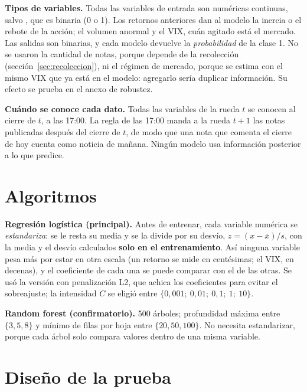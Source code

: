 \textbf{Tipos de variables.} Todas las variables de entrada son numéricas continuas, salvo
, que es binaria (0 o 1). Los retornos anteriores dan al modelo la inercia o el
rebote de la acción; el volumen anormal y el VIX, cuán agitado está el mercado. Las salidas son
binarias, y cada modelo devuelve la \textit{probabilidad} de la clase 1. No se usaron la cantidad de
notas, porque depende de la recolección (sección~\ref{sec:recoleccion}), ni el régimen de mercado,
porque se estima con el mismo VIX que ya está en el modelo: agregarlo sería duplicar información.
Su efecto se prueba en el anexo de robustez.

\textbf{Cuándo se conoce cada dato.} Todas las variables de la rueda $t$ se conocen al cierre de
$t$, a las 17:00. La regla de las 17:00 manda a la rueda $t+1$ las notas publicadas después del
cierre de $t$, de modo que una nota que comenta el cierre de hoy cuenta como noticia de mañana.
Ningún modelo usa información posterior a lo que predice.

\section{Algoritmos}

\textbf{Regresión logística (principal).} Antes de entrenar, cada variable numérica se
\textit{estandariza}: se le resta su media y se la divide por su desvío,
$z = (x - \bar x)/s$, con la media y el desvío calculados \textbf{solo en el entrenamiento}. Así
ninguna variable pesa más por estar en otra escala (un retorno se mide en centésimas; el VIX, en
decenas), y el coeficiente de cada una se puede comparar con el de las otras. Se usó la versión con
penalización L2, que achica los coeficientes para evitar el sobreajuste; la intensidad $C$ se eligió
entre $\{0{,}001;\ 0{,}01;\ 0{,}1;\ 1;\ 10\}$.

\textbf{Random forest (confirmatorio).} 500 árboles; profundidad máxima entre $\{3, 5, 8\}$ y mínimo
de filas por hoja entre $\{20, 50, 100\}$. No necesita estandarizar, porque cada árbol solo compara
valores dentro de una misma variable.

\section{Diseño de la prueba}
\label{sec:diseno}

